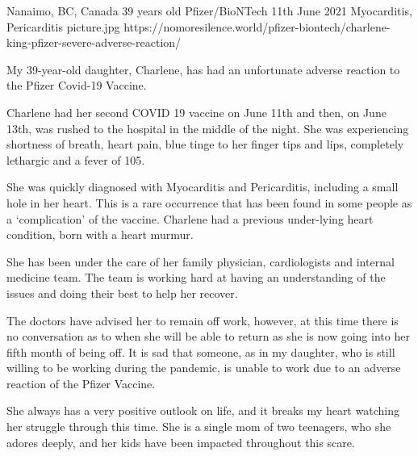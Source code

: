 {Nanaimo, BC, Canada}
{39 years old}
{Pfizer/BioNTech}
{11th June 2021}
{Myocarditis, Pericarditis}
{picture.jpg}
{https://nomoresilence.world/pfizer-biontech/charlene-king-pfizer-severe-adverse-reaction/}
{

My 39-year-old daughter, Charlene, has had an unfortunate adverse reaction to
the Pfizer Covid-19 Vaccine.

Charlene had her second COVID 19 vaccine on June 11th and then, on June 13th,
was rushed to the hospital in the middle of the night. She was experiencing
shortness of breath, heart pain, blue tinge to her finger tips and lips,
completely lethargic and a fever of 105.

She was quickly diagnosed with Myocarditis and Pericarditis, including a small
hole in her heart. This is a rare occurrence that has been found in some people
as a ‘complication’ of the vaccine. Charlene had a previous under-lying heart
condition, born with a heart murmur.

She has been under the care of her family physician, cardiologists and internal
medicine team. The team is working hard at having an understanding of the issues
and doing their best to help her recover.

The doctors have advised her to remain off work, however, at this time there is
no conversation as to when she will be able to return as she is now going into
her fifth month of being off. It is sad that someone, as in my daughter, who is
still willing to be working during the pandemic, is unable to work due to an
adverse reaction of the Pfizer Vaccine.

She always has a very positive outlook on life, and it breaks my heart watching
her struggle through this time. She is a single mom of two teenagers, who she
adores deeply, and her kids have been impacted throughout this scare.

}
